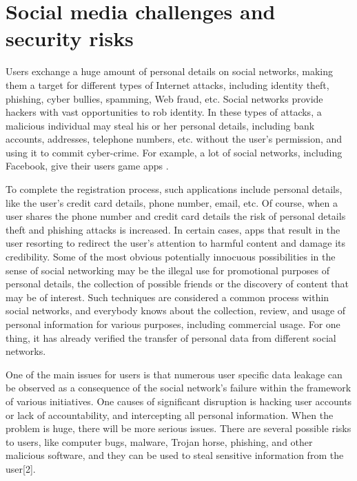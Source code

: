 \section{	Social media challenges and security risks}
\hspace*{0.3in}Users exchange a huge amount of personal details on
social networks, making them a target for different types of
Internet attacks, including identity theft, phishing, cyber
bullies, spamming, Web fraud, etc. Social networks provide
hackers with vast opportunities to rob identity. In these types
of attacks, a malicious individual may steal his or her personal
details, including bank accounts, addresses, telephone
numbers, etc. without the user's permission, and using it to
commit cyber-crime. For example, a lot of social networks,
including Facebook, give their users game apps .

   To complete the registration process, such applications
include personal details, like the user’s credit card details,
phone number, email, etc. Of course, when a user shares the
phone number and credit card details the risk of personal
details theft and phishing attacks is increased. In certain cases,
apps that result in the user resorting to redirect the user's
attention to harmful content and damage its credibility.
Some of the most obvious potentially innocuous
possibilities in the sense of social networking may be the
illegal use for promotional purposes of personal details, the
collection of possible friends or the discovery of content that
may be of interest. Such techniques are considered a common
process within social networks, and everybody knows about
the collection, review, and usage of personal information for
various purposes, including commercial usage. For one thing,
it has already verified the transfer of personal data from
different social networks.

One of the main issues for users is that numerous user
specific data leakage can be observed as a consequence of the
social network's failure within the framework of various
initiatives. One causes of significant disruption is hacking user
accounts or lack of accountability, and intercepting all
personal information. When the problem is huge, there will be
more serious issues. There are several possible risks to users,
like computer bugs, malware, Trojan horse, phishing, and
other malicious software, and they can be used to steal
sensitive information from the user[2].
\\



